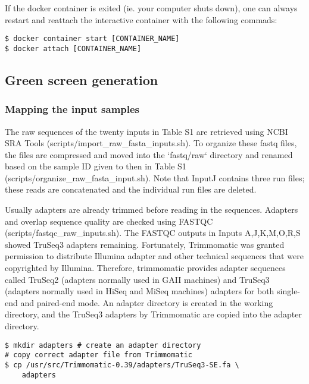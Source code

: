 \documentclass{article}
\begin{document}
\begin{sloppypar}
If the docker container is exited (ie. your computer shuts down), one can always restart and reattach the interactive container with the following commads:

\begin{verbatim}
$ docker container start [CONTAINER_NAME]
$ docker attach [CONTAINER_NAME] 
\end{verbatim}

\subsection{Green screen generation}
\subsubsection{Mapping the input samples}

The raw sequences of the twenty inputs in Table S1 are retrieved using NCBI SRA Tools ({\selectfont scripts/import\_raw\_fasta\_inputs.sh}). To organize these fastq files, the files are compressed and moved into the `fastq/raw` directory and renamed based on the sample ID given to then in Table S1 ({\selectfont scripts/organize\_raw\_fasta\_input.sh}). Note that InputJ contains three run files; these reads are concatenated and the individual run files are deleted.

Usually adapters are already trimmed before reading in the sequences. Adapters and overlap sequence quality are checked using FASTQC ({\selectfont scripts/fastqc\_raw\_inputs.sh}). The FASTQC outputs in Inputs A,J,K,M,O,R,S showed TruSeq3 adapters remaining. Fortunately, Trimmomatic was granted permission to distribute Illumina adapter and other technical sequences that were copyrighted by Illumina. Therefore, trimmomatic provides adapter sequences called TruSeq2 (adapters normally used in GAII machines) and TruSeq3 (adapters normally used in HiSeq and MiSeq machines) adapters for both single-end and paired-end mode. An adapter directory is created in the working directory, and the TruSeq3 adapters by Trimmomatic are copied into the adapter directory.

\begin{verbatim}
$ mkdir adapters # create an adapter directory
# copy correct adapter file from Trimmomatic
$ cp /usr/src/Trimmomatic-0.39/adapters/TruSeq3-SE.fa \
    adapters
\end{verbatim}


\end{sloppypar}
\end{document}

